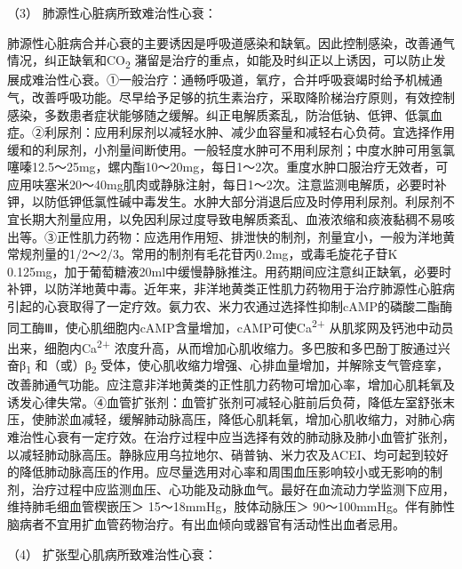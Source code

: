 \hypertarget{text00074.htmlux5cux23CHP3-3-3-4-2-4-3}{}
（3） 肺源性心脏病所致难治性心衰：

肺源性心脏病合并心衰的主要诱因是呼吸道感染和缺氧。因此控制感染，改善通气情况，纠正缺氧和CO\textsubscript{2}
潴留是治疗的重点，如能及时纠正以上诱因，可以防止发展成难治性心衰。①一般治疗：通畅呼吸道，氧疗，合并呼吸衰竭时给予机械通气，改善呼吸功能。尽早给予足够的抗生素治疗，采取降阶梯治疗原则，有效控制感染，多数患者症状能够随之缓解。纠正电解质紊乱，防治低钠、低钾、低氯血症。②利尿剂：应用利尿剂以减轻水肿、减少血容量和减轻右心负荷。宜选择作用缓和的利尿剂，小剂量间断使用。一般轻度水肿可不用利尿剂；中度水肿可用氢氯噻嗪12.5～25mg，螺内酯10～20mg，每日1～2次。重度水肿口服治疗无效者，可应用呋塞米20～40mg肌肉或静脉注射，每日1～2次。注意监测电解质，必要时补钾，以防低钾低氯性碱中毒发生。水肿大部分消退后应及时停用利尿剂。利尿剂不宜长期大剂量应用，以免因利尿过度导致电解质紊乱、血液浓缩和痰液黏稠不易咳出等。③正性肌力药物：应选用作用短、排泄快的制剂，剂量宜小，一般为洋地黄常规剂量的1/2～2/3。常用的制剂有毛花苷丙0.2mg，或毒毛旋花子苷K
0.125mg，加于葡萄糖液20ml中缓慢静脉推注。用药期间应注意纠正缺氧，必要时补钾，以防洋地黄中毒。近年来，非洋地黄类正性肌力药物用于治疗肺源性心脏病引起的心衰取得了一定疗效。氨力农、米力农通过选择性抑制cAMP的磷酸二酯酶同工酶Ⅲ，使心肌细胞内cAMP含量增加，cAMP可使Ca\textsuperscript{2+}
从肌浆网及钙池中动员出来，细胞内Ca\textsuperscript{2+}
浓度升高，从而增加心肌收缩力。多巴胺和多巴酚丁胺通过兴奋β\textsubscript{1}
和（或）β\textsubscript{2}
受体，使心肌收缩力增强、心排血量增加，并解除支气管痉挛，改善肺通气功能。应注意非洋地黄类的正性肌力药物可增加心率，增加心肌耗氧及诱发心律失常。④血管扩张剂：血管扩张剂可减轻心脏前后负荷，降低左室舒张末压，使肺淤血减轻，缓解肺动脉高压，降低心肌耗氧，增加心肌收缩力，对肺心病难治性心衰有一定疗效。在治疗过程中应当选择有效的肺动脉及肺小血管扩张剂，以减轻肺动脉高压。静脉应用乌拉地尔、硝普钠、米力农及ACEI、均可起到较好的降低肺动脉高压的作用。应尽量选用对心率和周围血压影响较小或无影响的制剂，治疗过程中应监测血压、心功能及动脉血气。最好在血流动力学监测下应用，维持肺毛细血管楔嵌压＞
15～18mmHg，肢体动脉压＞
90～100mmHg。伴有肺性脑病者不宜用扩血管药物治疗。有出血倾向或器官有活动性出血者忌用。

\hypertarget{text00074.htmlux5cux23CHP3-3-3-4-2-4-4}{}
（4） 扩张型心肌病所致难治性心衰：

